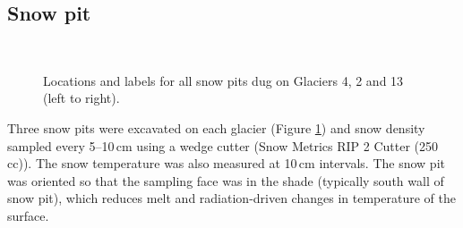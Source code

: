 \documentclass{sfuthesis}
\begin{document}
\subsection{Snow pit}
\label{sec:snowpit}

\begin{figure}[t]
	\centering
	\\
	\caption[Locations and labels for all snow pits dug on study glaciers]{Locations and labels for all snow pits dug on Glaciers 4, 2 and 13 (left to right).}
	\label{fig:snowpit_location_all}
	\end{figure}

Three snow pits were excavated on each glacier (Figure \ref{fig:snowpit_location_all}) and snow density sampled every 5--10\,cm using a wedge cutter (Snow Metrics RIP 2 Cutter (250 cc)). The snow temperature was also measured at 10\,cm intervals. The snow pit was oriented so that the sampling face was in the shade (typically south wall of snow pit), which reduces melt and radiation-driven changes in temperature of the surface. 
\end{document}
